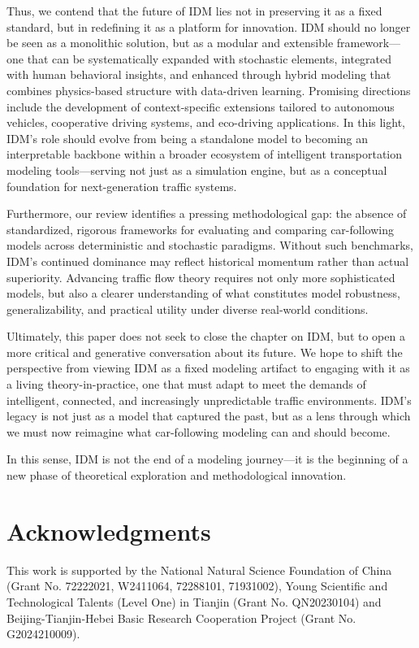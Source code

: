 \documentclass[a4paper,fleqn]{cas-sc}
\begin{document}
Thus, we contend that the future of IDM lies not in preserving it as a fixed standard, but in redefining it as a platform for innovation. IDM should no longer be seen as a monolithic solution, but as a modular and extensible framework—one that can be systematically expanded with stochastic elements, integrated with human behavioral insights, and enhanced through hybrid modeling that combines physics-based structure with data-driven learning. Promising directions include the development of context-specific extensions tailored to autonomous vehicles, cooperative driving systems, and eco-driving applications. In this light, IDM’s role should evolve from being a standalone model to becoming an interpretable backbone within a broader ecosystem of intelligent transportation modeling tools—serving not just as a simulation engine, but as a conceptual foundation for next-generation traffic systems.

Furthermore, our review identifies a pressing methodological gap: the absence of standardized, rigorous frameworks for evaluating and comparing car-following models across deterministic and stochastic paradigms. Without such benchmarks, IDM’s continued dominance may reflect historical momentum rather than actual superiority. Advancing traffic flow theory requires not only more sophisticated models, but also a clearer understanding of what constitutes model robustness, generalizability, and practical utility under diverse real-world conditions.

Ultimately, this paper does not seek to close the chapter on IDM, but to open a more critical and generative conversation about its future. We hope to shift the perspective from viewing IDM as a fixed modeling artifact to engaging with it as a living theory-in-practice, one that must adapt to meet the demands of intelligent, connected, and increasingly unpredictable traffic environments. IDM’s legacy is not just as a model that captured the past, but as a lens through which we must now reimagine what car-following modeling can and should become.

In this sense, IDM is not the end of a modeling journey—it is the beginning of a new phase of theoretical exploration and methodological innovation.



\section{Acknowledgments}
This work is supported by the National Natural Science Foundation of China (Grant No. 72222021, W2411064, 72288101, 71931002), Young Scientific and Technological Talents (Level One) in Tianjin (Grant No. QN20230104) and Beijing-Tianjin-Hebei Basic Research Cooperation Project (Grant No. G2024210009). 
\end{document}
